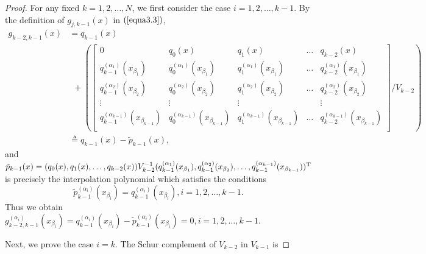 \documentclass[preprint,12pt]{elsarticle}
\begin{document}
\begin{proof}
For any fixed $k=1,2,\dots,N$, we first consider the case $i=1,2,\dots,k-1$. By the definition of $g_{j,k-1}(x)$ in $(\ref{equa3.3})$,
\begin{align*}
g_{k-2,k-1}(x)&=q_{k-1}(x)\\
&~~+ \left(\left[\begin{array}{c|cccc}
            0 & q_0(x) & q_1(x) & \dots & q_{k-2}(x) \\ \hline
            q_{k-1}^{(\alpha_1)}(x_{\beta_1}) & q_0^{(\alpha_1)}(x_{\beta_1}) & q_1^{(\alpha_1)}(x_{\beta_1}) & \dots & q_{k-2}^{(\alpha_1)}(x_{\beta_1}) \\
            q_{k-1}^{(\alpha_2)}(x_{\beta_2}) & q_0^{(\alpha_2)}(x_{\beta_2}) & q_1^{(\alpha_2)}(x_{\beta_2}) & \dots & q_{k-2}^{(\alpha_2)}(x_{\beta_2}) \\
            \vdots & \vdots & \vdots & ~ & \vdots \\
            q_{k-1}^{(\alpha_{k-1})}(x_{\beta_{k-1}}) & q_0^{(\alpha_{k-1})}(x_{\beta_{k-1}}) & q_1^{(\alpha_{k-1})}(x_{\beta_{k-1}}) & \dots & q_{k-2}^{(\alpha_{k-1})}(x_{\beta_{k-1}}) \\
            \end{array}\right]/V_{k-2}\right)\\
         &\triangleq q_{k-1}(x)-\tilde{p}_{k-1}(x),
\end{align*}
and  $\tilde{p}_{k-1}(x)=(q_0(x),q_1(x),\dots,q_{k-2}(x))V_{k-2}^{-1}( q_{k-1}^{(\alpha_1)}(x_{\beta_1}), q_{k-1}^{(\alpha_2)}(x_{\beta_2}),\dots, q_{k-1}^{(\alpha_{k-1})}(x_{\beta_{k-1}}))^\textup{T}$ is precisely the interpolation
polynomial which satisfies the conditions
$$\tilde{p}_{k-1}^{(\alpha_{i})}(x_{\beta_{i}})=q_{k-1}^{(\alpha_i)}(x_{\beta_i}), i=1,2,\dots,k-1.$$
Thus we obtain   $ g_{k-2,k-1}^{(\alpha_i)}(x_{\beta_i})=q_{k-1}^{(\alpha_i)}(x_{\beta_i})-\tilde{p}_{k-1}^{(\alpha_{i})}(x_{\beta_{i}})=0, i=1,2,\dots,k-1.$

Next, we prove the case $i=k$.
The Schur complement of $V_{k-2}$ in $V_{k-1}$ is


\end{proof}
\end{document}
